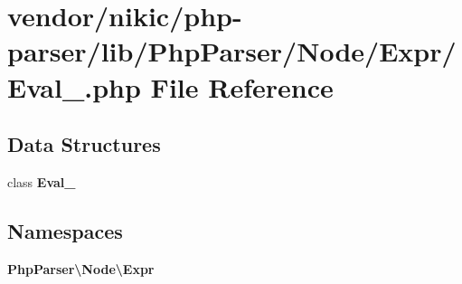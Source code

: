 \section{vendor/nikic/php-\/parser/lib/\+Php\+Parser/\+Node/\+Expr/\+Eval\+\_\+.php File Reference}
\label{_eval___8php}
\subsection*{Data Structures}
\begin{DoxyCompactItemize}
\item 
class {\bf Eval\+\_\+}
\end{DoxyCompactItemize}
\subsection*{Namespaces}
\begin{DoxyCompactItemize}
\item 
 {\bf Php\+Parser\textbackslash{}\+Node\textbackslash{}\+Expr}
\end{DoxyCompactItemize}

